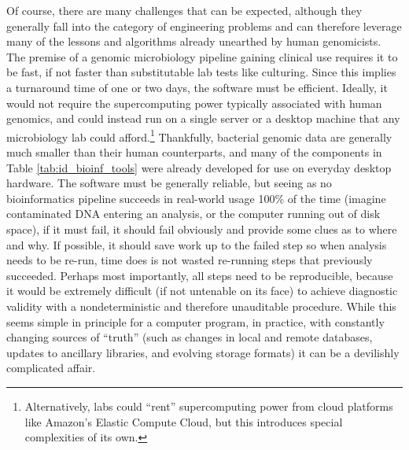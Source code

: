 Of course, there are many challenges that can be expected, although they generally fall into the category of engineering problems and can therefore leverage many of the lessons and algorithms already unearthed by human genomicists. The premise of a genomic microbiology pipeline gaining clinical use requires it to be fast, if not faster than substitutable lab tests like culturing.\autocite{Koser2012} Since this implies a turnaround time of one or two days, the software must be efficient. Ideally, it would not require the supercomputing power typically associated with human genomics, and could instead run on a single server or a desktop machine that any microbiology lab could afford.\footnote{Alternatively, labs could ``rent'' supercomputing power from cloud platforms like Amazon's Elastic Compute Cloud, but this introduces special complexities of its own.} Thankfully, bacterial genomic data are generally much smaller than their human counterparts, and many of the components in Table \ref{tab:id_bioinf_tools} were already developed for use on everyday desktop hardware. The software must be generally reliable, but seeing as no bioinformatics pipeline succeeds in real-world usage 100\% of the time (imagine contaminated DNA entering an analysis, or the computer running out of disk space), if it must fail, it should fail obviously and provide some clues as to where and why. If possible, it should save work up to the failed step so when analysis needs to be re-run, time does is not wasted re-running steps that previously succeeded. Perhaps most importantly, all steps need to be reproducible, because it would be extremely difficult (if not untenable on its face) to achieve diagnostic validity with a nondeterministic and therefore unauditable procedure. While this seems simple in principle for a computer program, in practice, with constantly changing sources of ``truth'' (such as changes in local and remote databases, updates to ancillary libraries, and evolving storage formats) it can be a devilishly complicated affair.

